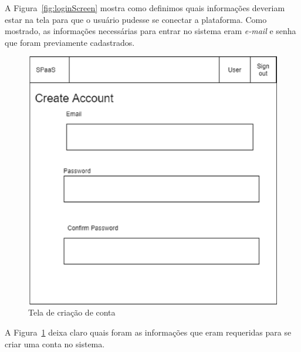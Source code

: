 \documentclass[11pt,twoside]{article}
\begin{document}
A Figura~\ref{fig:loginScreen} mostra como definimos quais informações deveriam estar na tela para que o usuário pudesse se conectar a plataforma. Como mostrado, 
as informações necessárias para entrar no sistema eram \emph{e-mail} e senha que foram previamente cadastrados.

\begin{figure}[!h]
  \centering
  \includegraphics[scale=0.4]{account_reg.eps}
  \caption{Tela de criação de conta}
  \label{fig:createScreen}
\end{figure}

A Figura~\ref{fig:createScreen} deixa claro quais foram as informações que eram requeridas para se criar uma conta no sistema. 
\end{document}
